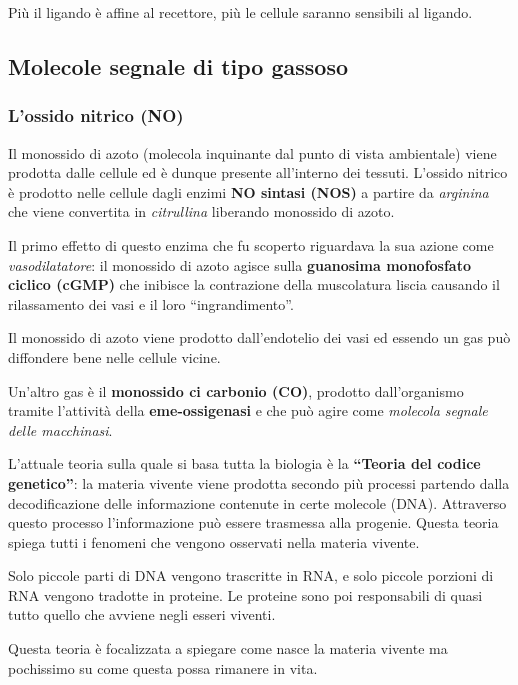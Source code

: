 \documentclass[]{article}
\begin{document}
Più il ligando è affine al recettore, più le cellule saranno sensibili
al ligando.

\subsection{Molecole segnale di tipo
gassoso}\label{molecole-segnale-di-tipo-gassoso}

\subsubsection{L'ossido nitrico (NO)}\label{lossido-nitrico-no}

Il monossido di azoto (molecola inquinante dal punto di vista
ambientale) viene prodotta dalle cellule ed è dunque presente
all'interno dei tessuti. L'ossido nitrico è prodotto nelle cellule dagli
enzimi \textbf{NO sintasi (NOS)} a partire da \emph{arginina} che viene
convertita in \emph{citrullina} liberando monossido di azoto.

Il primo effetto di questo enzima che fu scoperto riguardava la sua
azione come \emph{vasodilatatore}: il monossido di azoto agisce sulla
\textbf{guanosima monofosfato ciclico (cGMP)} che inibisce la
contrazione della muscolatura liscia causando il rilassamento dei vasi e
il loro ``ingrandimento''.

Il monossido di azoto viene prodotto dall'endotelio dei vasi ed essendo
un gas può diffondere bene nelle cellule vicine.

Un'altro gas è il \textbf{monossido ci carbonio (CO)}, prodotto
dall'organismo tramite l'attività della \textbf{eme-ossigenasi} e che
può agire come \emph{molecola segnale delle macchinasi}.

L'attuale teoria sulla quale si basa tutta la biologia è la
\textbf{``Teoria del codice genetico''}: la materia vivente viene
prodotta secondo più processi partendo dalla decodificazione delle
informazione contenute in certe molecole (DNA). Attraverso questo
processo l'informazione può essere trasmessa alla progenie. Questa
teoria spiega tutti i fenomeni che vengono osservati nella materia
vivente.

Solo piccole parti di DNA vengono trascritte in RNA, e solo piccole
porzioni di RNA vengono tradotte in proteine. Le proteine sono poi
responsabili di quasi tutto quello che avviene negli esseri viventi.

Questa teoria è focalizzata a spiegare come nasce la materia vivente ma
pochissimo su come questa possa rimanere in vita.
\end{document}

